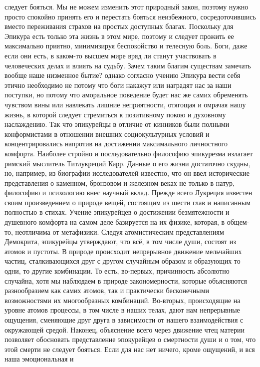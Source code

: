следует бояться. Мы не можем изменить этот природный закон, поэтому нужно просто
спокойно принять его и перестать бояться неизбежного, сосредоточившись вместо
переживания страхов на простых доступных благах. Поскольку для Эпикура есть
только эта жизнь в этом мире, поэтому и следует прожить ее максимально приятно,
минимизируя беспокойство и телесную боль. Боги, даже если они есть, в каком-то
высшем мире вряд ли станут участвовать в человеческих делах и влиять на судьбу.
Зачем таким благим существам замечать вообще наше низменное бытие? однако
согласно учению Эпикура вести себя этично необходимо не потому что боги накажут
или наградят нас за наши поступки, но потому что аморальное поведение будет нас
же самих обременять чувством вины или навлекать лишние неприятности, отягощая и
омрачая нашу жизнь, в которой следует стремиться к позитивному покою и духовному
наслаждению. Так что эпикурейцы в отличие от кинников были полными конформистами
в отношении внешних социокультурных условий и концентрировались напротив на
достижении максимального личностного комфорта. Наиболее стройно и
последовательно философию эпикурезма излагает римский мыслитель Титлукреций
Карр. Данные о его жизни достаточно скудны, но, например, из биографии
исследователей известно, что он ввел исторические представления о каменном,
бронзовом и железном веках не только в натур, философию и психологию внес
научный вклад. Прежде всего Лукреция известен своим произведением о природе
вещей, состоящим из шести глав и написанным полностью в стихах. Учение
эпикурейцев о достижении безмятежности и душевного комфорта на самом деле
базируется на их физике, которая, в общем-то, неотличима от метафизики. Следуя
атомистическим представлениям Демокрита, эпикурейцы утверждают, что всё, в том
числе души, состоят из атомов и пустоты. В природе происходит непрерывное
движение мельчайших частиц, сталкивающихся друг с другом случайным образом и
образующих то одни, то другие комбинации. То есть, во-первых, причинность
абсолютно случайна, хотя мы наблюдаем в природе закономерности, которые
объясняются разнообразием как самих атомов, так и практически бесконечными
возможностями их многообразных комбинаций. Во-вторых, происходящие на уровне
атомов процессы, в том числе в наших телах, дают нам непрерывные ощущения,
сменяющие друг друга в зависимости от нашего взаимодействия с окружающей средой.
Наконец, объяснение всего через движение чтец материи позволяет обосновать
представление эпокурейцев о смертности души и о том, что этой смерти не следует
бояться. Если для нас нет ничего, кроме ощущений, и вся наша эмоциональная и
